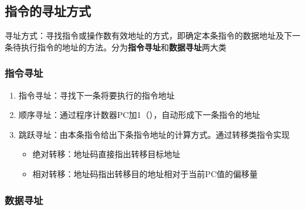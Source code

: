 \documentclass[a4paper,12pt]{article}
\begin{document}
    \subsection{指令的寻址方式}

    寻址方式：寻找指令或操作数有效地址的方式，即确定本条指令的数据地址及下一条待执行指令的地址的方法。分为\textbf{指令寻址}和\textbf{数据寻址}两大类

    \subsubsection{指令寻址}

    \begin{enumerate}
        \item 指令寻址：寻找下一条将要执行的指令地址
        \item 顺序寻址：通过程序计数器PC加1（{\color{red}{1条指令的长度}}），自动形成下一条指令的地址
        \item 跳跃寻址：由本条指令给出下条指令地址的计算方式。通过转移类指令实现
        \begin{itemize}
            \item 绝对转移：地址码直接指出转移目标地址
            \item 相对转移：地址码指出转移目的地址相对于当前PC值的偏移量
        \end{itemize}
    \end{enumerate}

    \subsubsection{数据寻址}
\end{document}
